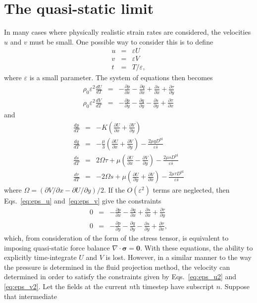\documentclass[11pt]{article}
\newcommand{\p}{\partial}
\newcommand{\bsig}{\boldsymbol\sigma}
\newcommand{\prx}[1]{\frac{\p #1}{\p x}}
\newcommand{\pry}[1]{\frac{\p #1}{\p y}}
\newcommand{\Dpl}{D^\textrm{pl}}
\renewcommand{\vec}[1]{\mathbf{#1}}
\renewcommand{\epsilon}{\varepsilon}
\begin{document}
\section*{The quasi-static limit}
In many cases where physically realistic strain rates are considered, the
velocities $u$ and $v$ must be small. One possible way to consider this is to
define
\begin{eqnarray*}
u &=& \epsilon U \\
v &=& \epsilon V \\
t &=& T/\epsilon,
\end{eqnarray*}
where $\epsilon$ is a small parameter. The system of equations then becomes 
\begin{eqnarray}
  \label{eq:eps_u} \rho_0 \epsilon^2 \frac{dU}{dT}&=&-\prx{p}-\prx{q}+\prx{s}+\pry{\tau} \\
  \label{eq:eps_v} \rho_0 \epsilon^2 \frac{dV}{dT}&=&-\pry{p}-\pry{q}-\pry{s}+\prx{\tau}
\end{eqnarray}
and
\begin{eqnarray}
  \frac{dp}{dT} &=& -K \left(\prx{U} +\pry{V}\right) \\
  \frac{dq}{dT} &=& - \frac{\mu}{3} \left(\prx{U} +\pry{V}\right) -\frac{2\mu q \Dpl}{\epsilon\bar{s}} \\
  \frac{ds}{dT} &=& 2\Omega \tau + \mu \left( \prx{U} - \pry{V} \right) -\frac{2\mu s \Dpl}{\epsilon\bar{s}} \\
  \label{eq:eps_tau} \frac{d\tau}{dT} &=& - 2\Omega s + \mu \left( \pry{U} + \prx{V} \right) -\frac{2\mu \tau \Dpl}{\epsilon\bar{s}}
\end{eqnarray}
where $\Omega= (\p V /\p x - \p U / \p y)/2$. If the $O(\epsilon^2)$ terms are
neglected, then Eqs.~\ref{eq:eps_u} and~\ref{eq:eps_v} give the constraints
\begin{eqnarray}
  \label{eq:eps_u2} 0&=&-\prx{p}-\prx{q}+\prx{s}+\pry{\tau} \\
  \label{eq:eps_v2} 0&=&-\pry{p}-\pry{q}-\pry{s}+\prx{\tau},
\end{eqnarray}
which, from consideration of the form of the stress tensor, is equivalent to
imposing quasi-static force balance $\nabla \cdot \bsig=\vec{0}$. With these
equations, the ability to explicitly time-integrate $U$ and $V$ is lost.
However, in a similar manner to the way the pressure is determined in the fluid
projection method, the velocity can determined in order to satisfy the
constraints given by Eqs.~\ref{eq:eps_u2} and \ref{eq:eps_v2}. Let the fields
at the current $n$th timestep have subscript $n$. Suppose that intermediate
\end{document}
